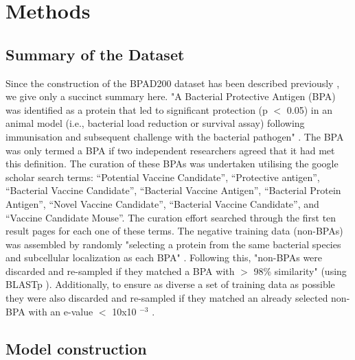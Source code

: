 \documentclass[10pt,journal,compsoc,twoside]{IEEEtran}
\begin{document}
\section{Methods}
\label{sec:methods}

\subsection{Summary of the Dataset}
\label{sec:methods1}

Since the construction of the BPAD200 dataset has been described previously \cite{heinson_2017}, we give only a succinct summary here. "A Bacterial Protective Antigen (BPA) was identified as a protein that led to significant protection (p \begin{math} < \end{math} 0.05) in an animal model (i.e., bacterial load reduction or survival assay) following immunisation and subsequent challenge with the bacterial pathogen" \cite{heinson_2017}. The BPA was only termed a BPA if two independent researchers agreed that it had met this definition. The curation of these BPAs was undertaken utilising the google scholar search terms: “Potential Vaccine Candidate”, “Protective antigen”, “Bacterial Vaccine Candidate”, “Bacterial Vaccine Antigen”, “Bacterial Protein Antigen”, “Novel Vaccine Candidate”, “Bacterial Vaccine Candidate”, and “Vaccine Candidate Mouse”. The curation effort searched through the first ten result pages for each one of these terms. The negative training data (non-BPAs) was assembled by randomly "selecting a protein from the same bacterial species and subcellular localization as each BPA" \cite{heinson_2017}. Following this, "non-BPAs were discarded and re-sampled if they matched a BPA with \begin{math} > \end{math} 98\% similarity" \cite{heinson_2019} (using BLASTp \cite{blast}). Additionally, to ensure as diverse a set of training data as possible they were also discarded and re-sampled if they matched an already selected non-BPA with an e-value \begin{math} < \end{math} 10x10 \begin{math} ^{-3} \end{math} \cite{heinson_2017,blast}.


\subsection{Model construction}
\label{sec:methods2}
\end{document}
